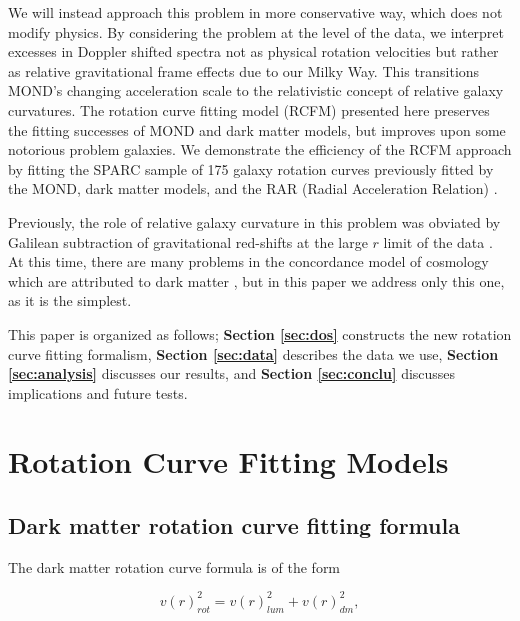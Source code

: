 \documentclass[reprint,%
 amsmath,amssymb,
 aps,
]{revtex4-1}
\begin{document}
We  will instead approach this problem in  more conservative way,  which does not  modify physics. By considering the problem at the level of the data, we interpret excesses in Doppler shifted spectra not as physical rotation velocities but rather as relative gravitational frame effects due to our Milky Way.  This transitions   MOND's  changing acceleration scale to the relativistic concept of    relative galaxy  curvatures. 
The rotation curve fitting model (RCFM)  presented here    preserves the fitting successes of MOND and dark matter models, but   improves upon   some notorious problem galaxies.   We demonstrate     the efficiency of the RCFM approach by fitting   the SPARC sample of 175 galaxy rotation curves  previously   fitted by the MOND, dark matter models, and the    RAR (Radial Acceleration Relation) \cite{McGaugh2016RAR,2016Lelli,McGaugh_2014,Li_2018}. 


  Previously, the role of relative
     galaxy curvature  in this problem was obviated 
       by  Galilean subtraction of   gravitational red-shifts at the  large $r$  limit of the data \citep{MTW}.   At this time, there are many problems in   the concordance model of   cosmology which are attributed to dark matter \cite{2010dmp..book.....S,Tully:2014gfa,Naidu_2022}, but in
 this paper we address only this  one, as it is the simplest. 

 
 This paper  is organized as follows;
{\bf Section \ref{sec:dos}} constructs  the new rotation curve  fitting formalism, 
{\bf Section \ref{sec:data}}   describes  the data  we use, 
 {\bf Section \ref{sec:analysis}}   discusses our results, 
 and  {\bf Section \ref{sec:conclu}}   discusses implications and future tests.   
  

  
    

\section{ Rotation Curve Fitting Models  \label{sec:dos}}
 
 
 \subsection{Dark matter rotation curve fitting formula}
 
  

 The   dark matter rotation curve formula   is of the form

 \begin{equation}
v(r)^2_{rot}  =  v(r)^2_{lum}  +  v(r)^2_{dm},   
\label{eq:zonte1}
\end{equation} 
\end{document}
